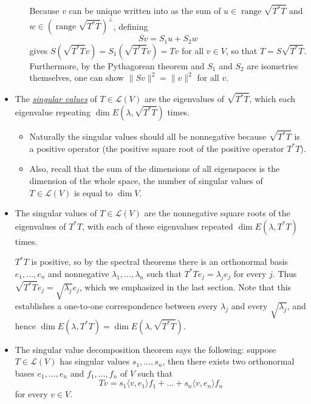 \documentclass[11pt]{article}
\newcommand{\df}[1]{\ul{\textit{\textsf{#1}}}}
\renewcommand{\r}{\operatorname{range}}
\renewcommand{\d}{\dim}
\newcommand{\inp}[2]{\langle #1, #2 \rangle}
\newcommand{\nm}[1]{\|#1\|}
\newcommand{\LV}{\mathcal{L}(V)}
\begin{document}
\begin{itemize}
\begin{itemize}
    Because $v$ can be unique written into as the sum of $u \in \r \sqrt{T^*T}$ and $w \in (\r \sqrt{T^*T})^\perp$, defining $$Sv = S_1 u+ S_2 w$$ gives $S(\sqrt{T^*T}v) = S_1(\sqrt{T^*T}v) = Tv$ for all $v \in V$, so that $T=S\sqrt{T^*T}$. Furthermore, by the Pythagorean theorem and $S_1$ and $S_2$ are  isometries themselves, one can show $\nm{Sv}^2=\nm{v}^2$ for all $v$.
\end{itemize}
\item The \df{singular values} of $T \in \LV$ are the eigenvalues of $\sqrt{T^*T}$, which each eigenvalue repeating $\d E(\lambda, \sqrt{T^*T})$ times.

\begin{itemize}
\item Naturally the singular values should all be nonnegative because $\sqrt{T^*T}$ is a positive operator (the positive square root of the positive operator $T^*T$).
\item Also, recall that the sum of the dimensions of all eigenspaces is the dimension of the whole space, the number of singular values of $T \in \LV$ is equal to $\d V$.
\end{itemize}

\item The singular values of $T \in \LV$ are the nonnegative square roots of the eigenvalues of $T^*T$, with each of these eigenvalues repeated $\d E(\lambda,T^*T)$ times.

$T^*T$ is positive, so by the spectral theorems there is an orthonormal basis $e_1,\dots,e_n$ and nonnegative $\lambda_1,\dots,\lambda_n$ such that $T^*Te_j = \lambda_j e_j$ for every $j$. Thus $\sqrt{T^*T}e_j=\sqrt{\lambda_j}e_j$, which we emphasized in the last section. Note that this establishes a one-to-one correspondence between every $\lambda_j$ and every $\sqrt{\lambda_j}$, and hence $\d E(\lambda, T^*T) = \d E(\lambda, \sqrt{T^*T})$.

\item The singular value decomposition theorem says the following: suppose $T \in \LV$ has singular values $s_1,\dots,s_n$, then there exists two orthonormal bases $e_1,\dots,e_n$ and $f_1,\dots,f_n$ of $V$ such that $$Tv = s_1\inp{v}{e_1}f_1 + \dots + s_n\inp{v}{e_n}f_n$$ for every $v \in V$.


\end{itemize}
\end{document}
